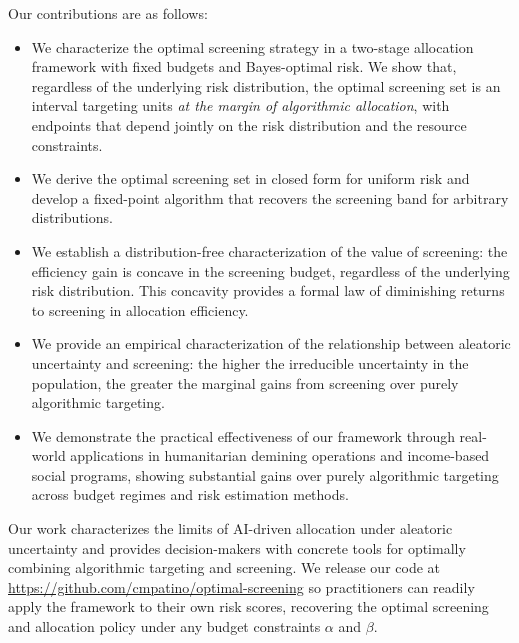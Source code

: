 Our contributions are as follows:
\begin{itemize}
    \item We characterize the optimal screening strategy in a two-stage allocation framework with fixed budgets and Bayes-optimal risk. We show that, regardless of the underlying risk distribution, the optimal screening set is an interval targeting units \textit{at the margin of algorithmic allocation}, with endpoints that depend jointly on the risk distribution and the resource constraints.


    \item We derive the optimal screening set in closed form for uniform risk and develop a fixed-point algorithm that recovers the screening band for arbitrary distributions.
   
    \item We establish a distribution-free characterization of the value of screening: the efficiency gain is concave in the screening budget, regardless of the underlying risk distribution. This concavity provides a formal law of diminishing returns to screening in allocation efficiency.        
    
    \item We provide an empirical characterization of the relationship between aleatoric uncertainty and screening: the higher the irreducible uncertainty in the population, the greater the marginal gains from screening over purely algorithmic targeting.
    
    \item We demonstrate the practical effectiveness of our framework through real-world applications in humanitarian demining operations and income-based social programs, showing substantial gains over purely algorithmic targeting across budget regimes and risk estimation methods.
    
\end{itemize}

Our work characterizes the limits of AI-driven allocation under aleatoric uncertainty and provides decision-makers with concrete tools for optimally combining algorithmic targeting and screening. We release our code at \url{https://github.com/cmpatino/optimal-screening} so practitioners can readily apply the framework to their own risk scores, recovering the optimal screening and allocation policy under any budget constraints $\alpha$ and $\beta$.



